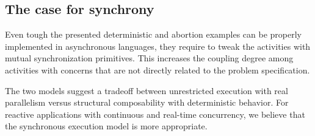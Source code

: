\documentclass{acm_proc_article-sp}
\newcommand{\1}{\;}
\newcommand{\2}{\;\;}
\newcommand{\3}{\;\;\;}
\newcommand{\5}{\;\;\;\;\;}
\begin{document}

\subsection{The case for synchrony}

Even tough the presented deterministic and abortion examples can be properly 
implemented in asynchronous languages, they require to tweak the activities 
with mutual
synchronization primitives.
%
This increases the coupling degree among activities with concerns that are not 
directly related to the problem specification.

The two models suggest a tradeoff between unrestricted execution with real 
parallelism versus structural composability with deterministic behavior.
%
For reactive applications with continuous and real-time concurrency, we believe 
that the synchronous execution model is more appropriate.

\end{document}
